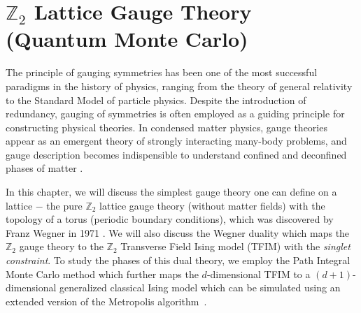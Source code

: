 \documentclass[../thesis_main.tex]{subfiles}
\begin{document}
\chapter[$\mathbb{Z}_2$ Lattice Gauge Theory (Quantum Monte Carlo)]{$\mathbb{Z}_2$ Lattice Gauge Theory $\qquad$(Quantum Monte Carlo)}
The principle of gauging symmetries has been one of the most successful paradigms in the history of physics, ranging from the theory of general relativity to the Standard Model of particle physics. Despite the introduction of redundancy, gauging of symmetries is often employed as a guiding principle for constructing physical theories. In condensed matter physics, gauge theories appear as an emergent theory of strongly interacting many-body problems, and gauge description becomes indispensible to understand confined and deconfined phases of matter \cite{Sergej,Mathur_et_al}. 

In this chapter, we will discuss the simplest gauge theory one can define on a lattice $-$ the pure $\mathbb{Z}_2$ lattice gauge theory (without matter fields) with the topology of a torus (periodic boundary conditions), which was discovered by Franz Wegner in 1971 \cite{wegner2014duality}. We will also discuss the Wegner duality which maps the $\mathbb{Z}_2$ gauge theory to the $\mathbb{Z}_2$ Transverse Field Ising model (TFIM) with the \textit{singlet constraint}. To study the phases of this dual theory, we employ the Path Integral Monte Carlo method which further maps the $d$-dimensional TFIM to a $(d+1)$-dimensional generalized classical Ising model which can be simulated using an extended version of the Metropolis algorithm~\cite{gupta_pragati.}.
\end{document}
